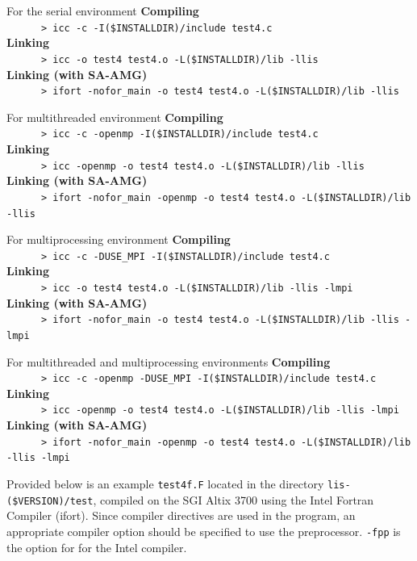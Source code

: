 \documentclass[a4paper]{article}
\begin{document}
\begin{itembox}[l]{For the serial environment}
\small
{\bf Compiling}\\
\verb+      > icc -c -I($INSTALLDIR)/include test4.c+\\
{\bf Linking}\\
\verb+      > icc -o test4 test4.o -L($INSTALLDIR)/lib -llis+\\
{\bf Linking (with SA-AMG)}\\
\verb+      > ifort -nofor_main -o test4 test4.o -L($INSTALLDIR)/lib -llis+
\end{itembox}
\begin{itembox}[l]{For multithreaded environment}
\small
{\bf Compiling}\\
\verb+      > icc -c -openmp -I($INSTALLDIR)/include test4.c+\\
{\bf Linking}\\
\verb+      > icc -openmp -o test4 test4.o -L($INSTALLDIR)/lib -llis+\\
{\bf Linking (with SA-AMG)}\\
\verb+      > ifort -nofor_main -openmp -o test4 test4.o -L($INSTALLDIR)/lib -llis+
\end{itembox}
\begin{itembox}[l]{For multiprocessing environment}
\small
{\bf Compiling}\\
\verb+      > icc -c -DUSE_MPI -I($INSTALLDIR)/include test4.c+\\
{\bf Linking}\\
\verb+      > icc -o test4 test4.o -L($INSTALLDIR)/lib -llis -lmpi+\\
{\bf Linking (with SA-AMG)}\\
\verb+      > ifort -nofor_main -o test4 test4.o -L($INSTALLDIR)/lib -llis -lmpi+
\end{itembox}
\begin{itembox}[l]{For multithreaded and multiprocessing environments}
\small
{\bf Compiling}\\
\verb+      > icc -c -openmp -DUSE_MPI -I($INSTALLDIR)/include test4.c+\\
{\bf Linking}\\
\verb+      > icc -openmp -o test4 test4.o -L($INSTALLDIR)/lib -llis -lmpi+\\
{\bf Linking (with SA-AMG)}\\
\verb+      > ifort -nofor_main -openmp -o test4 test4.o -L($INSTALLDIR)/lib -llis -lmpi+
\end{itembox}

Provided below is an example \verb|test4f.F| located 
in the directory \verb|lis-($VERSION)/test|, compiled on the SGI Altix 3700 
using the Intel Fortran Compiler (ifort). 
Since compiler directives are used in the program, 
an appropriate compiler option should be specified to use the preprocessor.
\verb|-fpp| is the option for for the Intel compiler. 
\end{document}
